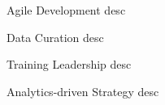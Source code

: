 



\begin{cvhonors}

  \cvhonor
    {Agile Development} %
    {desc} %
    {} %
    {} %

  \cvhonor
    {Data Curation} %
    {desc} %
    {} %
    {} %

  \cvhonor
    {Training Leadership} %
    {desc} %
    {} %
    {} %

  \cvhonor
    {Analytics-driven Strategy} %
    {desc} %
    {} %
    {} %

\end{cvhonors}




